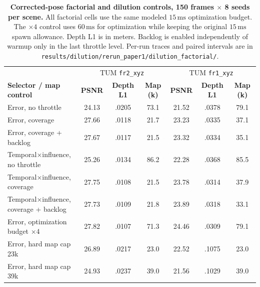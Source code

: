 \begin{table}[t]
\centering
\footnotesize\setlength{\tabcolsep}{4pt}
\begin{tabular}{lcccccc}
\toprule
& \multicolumn{3}{c}{TUM \texttt{fr2\_xyz}} & \multicolumn{3}{c}{TUM \texttt{fr1\_xyz}} \\
\textbf{Selector / map control} & \textbf{PSNR} & \textbf{Depth L1} & \textbf{Map (k)} & \textbf{PSNR} & \textbf{Depth L1} & \textbf{Map (k)} \\
\midrule
Error, no throttle & 24.13 & .0205 & 73.1 & 21.52 & .0378 & 79.1 \\
Error, coverage & 27.66 & .0118 & 21.7 & 23.23 & .0335 & 37.1 \\
Error, coverage + backlog & 27.67 & .0117 & 21.5 & 23.32 & .0334 & 35.1 \\
Temporal$\times$influence, no throttle & 25.26 & .0134 & 86.2 & 22.28 & .0368 & 85.5 \\
Temporal$\times$influence, coverage & 27.75 & .0108 & 21.5 & 23.78 & .0314 & 37.9 \\
Temporal$\times$influence, coverage + backlog & 27.73 & .0109 & 21.8 & 23.89 & .0318 & 33.1 \\
\midrule
Error, optimization budget $\times4$ & 27.82 & .0107 & 71.3 & 24.46 & .0309 & 79.1 \\
Error, hard map cap 23k & 26.89 & .0217 & 23.0 & 22.52 & .1075 & 23.0 \\
Error, hard map cap 39k & 24.93 & .0237 & 39.0 & 21.56 & .1029 & 39.0 \\
\bottomrule
\end{tabular}
\caption{\textbf{Corrected-pose factorial and dilution controls, 150 frames $\times$ 8 seeds per scene.} All factorial cells use the same modeled $15\,\mathrm{ms}$ optimization budget. The $\times4$ control uses $60\,\mathrm{ms}$ for optimization while keeping the original $15\,\mathrm{ms}$ spawn allowance. Depth L1 is in meters. Backlog is enabled independently of warmup only in the last throttle level. Per-run traces and paired intervals are in \texttt{results/dilution/rerun\_paper1/dilution\_factorial/}.}
\label{tab:factorial}
\end{table}
